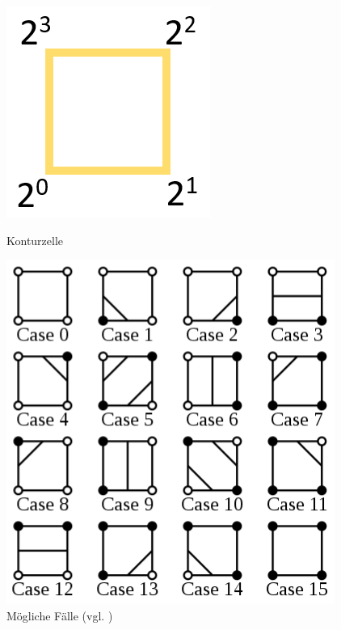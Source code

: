 \begin{figure}[!htb]
	\includegraphics[width=\linewidth]{img/marching_square_corners.png}
	\caption{Konturzelle}\label{fig:marching_square_corners}
	\endminipage\hfill
	\includegraphics[width=\linewidth]{img/marching_square_wiki.png}
	\caption{Mögliche Fälle (vgl. \cite{Wisq2022	})}\label{fig:marching_square_cases}
	\endminipage\hfill
\end{figure}
